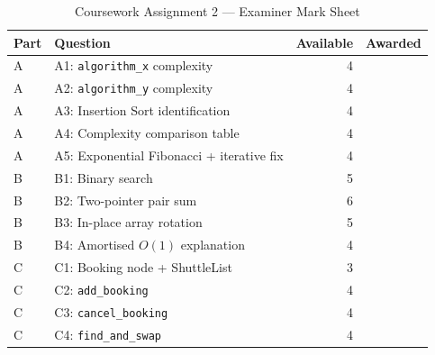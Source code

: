 \documentclass[11pt,a4paper]{article}
\begin{document}
\begin{table}[h!]
    \centering
    \caption{Coursework Assignment 2 --- Examiner Mark Sheet}
    \vspace{0.2cm}
    \begin{tabular}{llrr}
        \toprule
        \textbf{Part} & \textbf{Question} & \textbf{Available} & \textbf{Awarded} \\
        \midrule
        A & A1: \texttt{algorithm\_x} complexity           & 4  & \underline{\hspace{1cm}} \\
        A & A2: \texttt{algorithm\_y} complexity           & 4  & \underline{\hspace{1cm}} \\
        A & A3: Insertion Sort identification              & 4  & \underline{\hspace{1cm}} \\
        A & A4: Complexity comparison table                & 4  & \underline{\hspace{1cm}} \\
        A & A5: Exponential Fibonacci + iterative fix      & 4  & \underline{\hspace{1cm}} \\
        \midrule
        B & B1: Binary search                              & 5  & \underline{\hspace{1cm}} \\
        B & B2: Two-pointer pair sum                       & 6  & \underline{\hspace{1cm}} \\
        B & B3: In-place array rotation                    & 5  & \underline{\hspace{1cm}} \\
        B & B4: Amortised $O(1)$ explanation               & 4  & \underline{\hspace{1cm}} \\
        \midrule
        C & C1: Booking node + ShuttleList                 & 3  & \underline{\hspace{1cm}} \\
        C & C2: \texttt{add\_booking}                      & 4  & \underline{\hspace{1cm}} \\
        C & C3: \texttt{cancel\_booking}                   & 4  & \underline{\hspace{1cm}} \\
        C & C4: \texttt{find\_and\_swap}                   & 4  & \underline{\hspace{1cm}} \\

\end{tabular}
\end{table}
\end{document}
